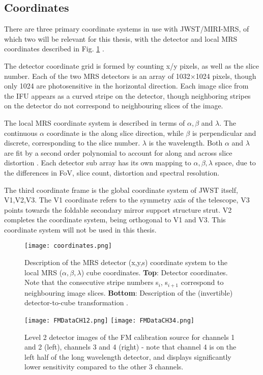 \subsection{Coordinates}
There are three primary coordinate systems in use with JWST/MIRI-MRS, of which two will be relevant for this thesis, with the detector and local MRS coordinates described in Fig. \ref{fig:mrscoords} \parencite{Argyriou2020}.

The detector coordinate grid is formed by counting x/y pixels, as well as the slice number.
Each of the two MRS detectors is an array of 1032$\times$1024 pixels, though only 1024 are photosensitive in the horizontal direction.
Each image slice from the IFU appears as a curved stripe on the detector, though neighboring stripes on the detector do not correspond to neighbouring slices of the image. 

The local MRS coordinate system is described in terms of $\alpha,\beta$ and $\lambda$. The continuous $\alpha$ coordinate is the along slice direction, while $\beta$ is perpendicular and discrete, corresponding to the slice number. $\lambda$ is the wavelength. Both $\alpha$ and $\lambda$ are fit by a second order polynomial to account for along and across slice distortion \parencite{MIRI6}. Each detector sub array has its own mapping to $\alpha,\beta,\lambda$ space, due to the differences in FoV, slice count, distortion and spectral resolution.

The third coordinate frame is the global coordinate system of JWST itself, V1,V2,V3. The V1 coordinate refers to the symmetry axis of the telescope, V3 points towards the foldable secondary mirror support structure strut. V2 completes the coordinate system, being orthogonal to V1 and V3. This coordinate system will not be used in this thesis.

\begin{figure}[t]
	\texttt{[image: coordinates.png]}
	\caption{Description of the MRS detector (x,y,s) coordinate system to the local MRS ($\alpha,\beta,\lambda$) cube coordinates. \textbf{Top}: Detector coordinates. Note that the consecutive stripe numbers s$_{i}$, s$_{i+1}$ correspond to neighbouring image slices. \textbf{Bottom}: Description of the (invertible) detector-to-cube transformation \parencite{Argyriou2020}.}
	\label{fig:mrscoords}	
\end{figure}

\begin{figure}[t]
	\centering
	\texttt{[image: FMDataCH12.png]}
	\texttt{[image: FMDataCH34.png]}
	\caption{Level 2 detector images of the FM calibration source for channels 1 and 2 (left), channels 3 and 4 (right) - note that channel 4 is on the left half of the long wavelength detector, and displays significantly lower sensitivity compared to the other 3 channels.}
	\label{fig:flatfield}
\end{figure}
